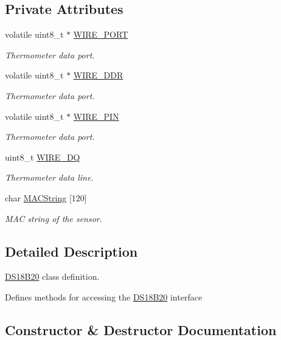 \subsection*{Private Attributes}
\begin{DoxyCompactItemize}
\item 
volatile uint8\+\_\+t $\ast$ \hyperlink{classDS18B20_a4e8d420cd118999883bde12e766bc1d4}{W\+I\+R\+E\+\_\+\+P\+O\+RT}
\begin{DoxyCompactList}\small\item\em Thermometer data port. \end{DoxyCompactList}\item 
volatile uint8\+\_\+t $\ast$ \hyperlink{classDS18B20_a06a1f548d087b8d8971dee5e94653f5c}{W\+I\+R\+E\+\_\+\+D\+DR}
\begin{DoxyCompactList}\small\item\em Thermometer data port. \end{DoxyCompactList}\item 
volatile uint8\+\_\+t $\ast$ \hyperlink{classDS18B20_a03a1ad890f9713fc10dc353c9779a7f2}{W\+I\+R\+E\+\_\+\+P\+IN}
\begin{DoxyCompactList}\small\item\em Thermometer data port. \end{DoxyCompactList}\item 
uint8\+\_\+t \hyperlink{classDS18B20_aebc6a6ab3c604f19dac9a24ef3301938}{W\+I\+R\+E\+\_\+\+DQ}
\begin{DoxyCompactList}\small\item\em Thermometer data line. \end{DoxyCompactList}\item 
char \hyperlink{classDS18B20_a6884de10b175289718239bdac0b8e52e}{M\+A\+C\+String} \mbox{[}120\mbox{]}
\begin{DoxyCompactList}\small\item\em M\+AC string of the sensor. \end{DoxyCompactList}\end{DoxyCompactItemize}


\subsection{Detailed Description}
\hyperlink{classDS18B20}{D\+S18\+B20} class definition. 

Defines methods for accessing the \hyperlink{classDS18B20}{D\+S18\+B20} interface 

\subsection{Constructor \& Destructor Documentation}
